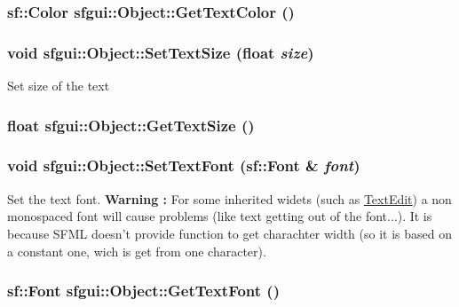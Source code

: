 \hypertarget{classsfgui_1_1Object_df734af2a7ca4ad600fe8bff51ed06cc}{
\subsubsection[GetTextColor]{\setlength{\rightskip}{0pt plus 5cm}sf::Color sfgui::Object::GetTextColor ()}}
\label{classsfgui_1_1Object_df734af2a7ca4ad600fe8bff51ed06cc}


\hypertarget{classsfgui_1_1Object_01fb5dcac8bac061999ce661d13f296e}{
\subsubsection[SetTextSize]{\setlength{\rightskip}{0pt plus 5cm}void sfgui::Object::SetTextSize (float {\em size})}}
\label{classsfgui_1_1Object_01fb5dcac8bac061999ce661d13f296e}




Set size of the text \hypertarget{classsfgui_1_1Object_a6fae4cfa68982563c49b8b13b11966b}{
\subsubsection[GetTextSize]{\setlength{\rightskip}{0pt plus 5cm}float sfgui::Object::GetTextSize ()}}
\label{classsfgui_1_1Object_a6fae4cfa68982563c49b8b13b11966b}


\hypertarget{classsfgui_1_1Object_41801231361e4866d99ce7d4ef32e53d}{
\subsubsection[SetTextFont]{\setlength{\rightskip}{0pt plus 5cm}void sfgui::Object::SetTextFont (sf::Font \& {\em font})}}
\label{classsfgui_1_1Object_41801231361e4866d99ce7d4ef32e53d}




Set the text font. {\bf Warning : } For some inherited widets (such as \hyperlink{classsfgui_1_1TextEdit}{TextEdit}) a non monospaced font will cause problems (like text getting out of the font...). It is because SFML doesn't provide function to get charachter width (so it is based on a constant one, wich is get from one character). \hypertarget{classsfgui_1_1Object_5f1d579d8ebba512fb983622552fe40f}{
\subsubsection[GetTextFont]{\setlength{\rightskip}{0pt plus 5cm}sf::Font sfgui::Object::GetTextFont ()}}
\label{classsfgui_1_1Object_5f1d579d8ebba512fb983622552fe40f}


